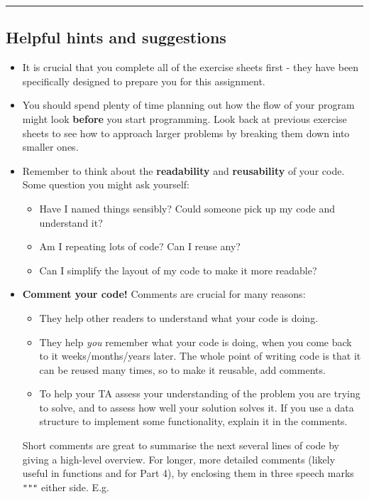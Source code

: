 \documentclass[11pt]{report}
\begin{document}
\vspace{1em}
\hrule
\vspace{1em}

\subsection*{Helpful hints and suggestions}
\begin{itemize}
    \item It is crucial that you complete all of the exercise sheets first - they have been specifically designed to prepare you for this assignment.
	\item You should spend plenty of time planning out how the flow of your program might look \textbf{before} you start programming. Look back at previous exercise sheets to see how to approach larger problems by breaking them down into smaller ones.
	\item Remember to think about the \textbf{readability} and \textbf{reusability} of your code. Some question you might ask yourself:
	\begin{itemize}
		\item Have I named things sensibly? Could someone pick up my code and understand it?
		\item Am I repeating lots of code? Can I reuse any?
		\item Can I simplify the layout of my code to make it more readable? 
	\end{itemize}
	\item \textbf{Comment your code!} Comments are crucial for many reasons:
	\begin{itemize}
		\item They help other readers to understand what your code is doing.
		\item They help \emph{you} remember what your code is doing, when you come back to it weeks/months/years later. The whole point of writing code is that it can be reused many times, so to make it reusable, add comments.
		\item To help your TA assess your understanding of the problem you are trying to solve, and to assess how well your solution solves it. If you use a data structure to implement some functionality, explain it in the comments.
	\end{itemize}
	Short comments are great to summarise the next several lines of code by giving a high-level overview. For longer, more detailed comments (likely useful in functions and for Part 4), by enclosing them in three speech marks {\tt """} either side. E.g.
	

\end{itemize}
\end{document}
